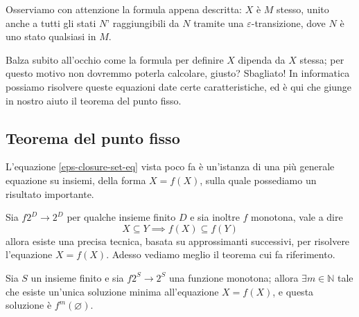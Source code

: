 \documentclass[class=book, crop=false, oneside, 12pt]{standalone}
\begin{document}
Osserviamo con attenzione la formula appena descritta: \(X\) è \(M\) stesso, unito anche a tutti gli stati \(N’\) raggiungibili da \(N\) tramite una \(\varepsilon\)-transizione, dove \(N\) è uno stato qualsiasi in \(M\).

Balza subito all'occhio come la formula per definire \(X\) dipenda da \(X\) stessa; per questo motivo non dovremmo poterla calcolare, giusto? 
Sbagliato! In informatica possiamo risolvere queste equazioni date certe caratteristiche, ed è qui che giunge in nostro aiuto il teorema del punto fisso. 


\subsection{Teorema del punto fisso}
L'equazione \ref{eps-closure-set-eq} vista poco fa è un'istanza di una più generale equazione su insiemi, della forma \(X = f(X)\), sulla quale possediamo un risultato importante.


Sia \(f 2^D \to 2^D\) per qualche insieme finito \(D\) e sia inoltre \( f \) monotona, vale a dire
\begin{equation*}
    X \subseteq Y \implies f(X) \subseteq f(Y)
\end{equation*}
allora esiste una precisa tecnica, basata su approssimanti successivi, per risolvere l'equazione \(X = f(X)\). Adesso vediamo meglio il teorema cui fa riferimento.

\begin{theorem}
    Sia \(S\) un insieme finito e sia \(f 2^S \to 2^S\) una funzione monotona; allora \(\exists m \in \mathbb{N}\) tale che esiste un'unica soluzione minima all'equazione \(X = f(X)\), e questa soluzione è \(f^m(\varnothing)\).
\end{theorem}
\end{document}
